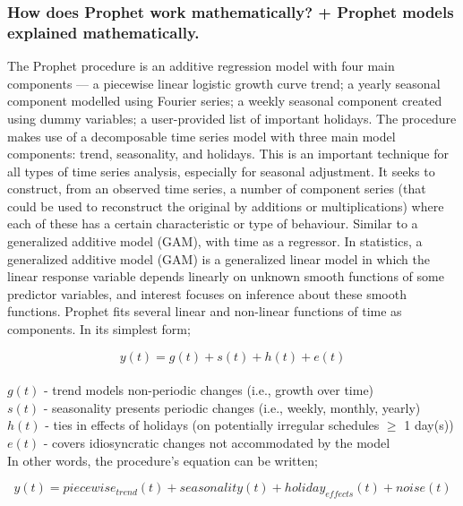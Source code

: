 \subsubsection{How does Prophet work mathematically? + Prophet models explained mathematically.}
The Prophet procedure is an additive regression model with four main components — a piecewise linear logistic growth curve trend; a yearly seasonal component modelled using Fourier series; a weekly seasonal component created using dummy variables; a user-provided list of important holidays. The procedure makes use of a decomposable time series model with three main model components: trend, seasonality, and holidays. This is an important technique for all types of time series analysis, especially for seasonal adjustment. It seeks to construct, from an observed time series, a number of component series (that could be used to reconstruct the original by additions or multiplications) where each of these has a certain characteristic or type of behaviour.
Similar to a generalized additive model (GAM), with time as a regressor.
In statistics, a generalized additive model (GAM) is a generalized linear model in which the linear response variable depends linearly on unknown smooth functions of some predictor variables, and interest focuses on inference about these smooth functions.
Prophet fits several linear and non-linear functions of time as components. In its simplest form;

\begin{equation}
    y(t) = g(t) + s(t) + h(t) + e(t)
\end{equation} \\ 
    
$g(t)$ - trend models non-periodic changes (i.e., growth over time) \\ 
$s(t)$ - seasonality presents periodic changes (i.e., weekly, monthly, yearly) \\ 
$h(t)$ - ties in effects of holidays (on potentially irregular schedules $\geq$ 1 day(s)) \\
$e(t)$ - covers idiosyncratic changes not accommodated by the model \\ 

In other words, the procedure’s equation can be written;

\begin{equation}
    y(t)=piecewise_{trend}(t) +seasonality(t)+holiday_{effects}(t) +noise(t)
\end{equation} \\

